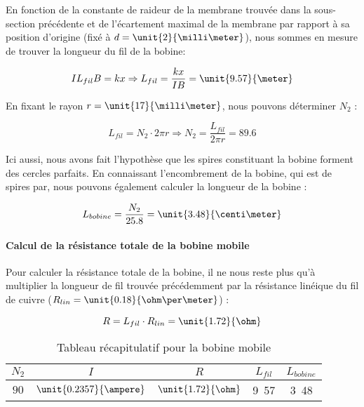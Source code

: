 En fonction de la constante de raideur de la membrane trouvée dans la sous-section précédente et de l'écartement
maximal de la membrane par rapport à sa position d'origine (fixé à $d = \unit{2}{\milli\meter}$), nous sommes en
mesure de trouver la longueur du fil de la bobine:

$$IL_{fil}B = kx \Rightarrow L_{fil} = \frac{kx}{IB} = \unit{9.57}{\meter}$$

En fixant le rayon $r=\unit{17}{\milli\meter}$, nous pouvons déterminer $N_2$ :

$$L_{fil} = N_2 \cdot 2\pi r \Rightarrow N_2 =  \frac{L_{fil}}{2\pi r} = 89.6$$

Ici aussi, nous avons fait l'hypothèse que les spires constituant la bobine forment des cercles parfaits.
En connaissant l'encombrement de la bobine, qui est de  spires par\unit{}{\centi\meter}, nous
pouvons également calculer la longueur de la bobine :

$$L_{bobine} = \frac{N_2}{25.8} = \unit{3.48}{\centi\meter}$$

\paragraph{Calcul de la résistance totale de la bobine mobile}
Pour calculer la résistance totale de la bobine, il ne nous reste plus qu'à multiplier la longueur de fil trouvée 
précédemment par la résistance linéique du fil de cuivre
($R_{lin} = \unit{0.18}{\ohm\per\meter}$) :

$$R = L_{fil} \cdot R_{lin} = \unit{1.72}{\ohm}$$

\begin{table}[!htb]
	\centering
	\begin{tabular}{c|c|c|c|c}
		$N_2$ & $I$ & $R$ & $L_{fil}$ & $L_{bobine}$\\
		\hline
		 $90$ & $\unit{0.2357}{\ampere}$ & $\unit{1.72}{\ohm}$ & \unit{9.57}{\meter} & \unit{3.48}{\centi\meter}
	\end{tabular}
	\caption{Tableau récapitulatif pour la bobine mobile}
\end{table}

